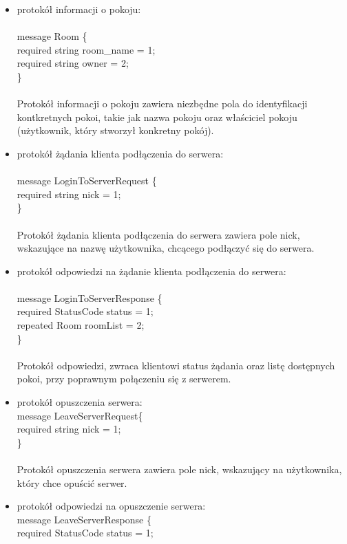 \documentclass{article}
\begin{document}
\begin{itemize}
\begin{itemize}
		
			\item protokół informacji o pokoju:\\ \\
				message Room \{\\
				required string room\_name = 1;\\
				required string owner = 2;\\
				\}\\
				\\
				Protokół informacji o pokoju zawiera niezbędne pola do identyfikacji kontkretnych pokoi, takie jak nazwa pokoju oraz właściciel pokoju (użytkownik, który stworzył konkretny pokój).
			\item protokół żądania klienta podłączenia do serwera: \\ \\
				message LoginToServerRequest \{\\
				required string nick = 1;\\
				\}\\
				\\	
				Protokół żądania klienta podłączenia do serwera zawiera pole nick, wskazujące na nazwę użytkownika, chcącego podłączyć się do serwera.
			\item protokół odpowiedzi na żądanie klienta podłączenia do serwera: \\ \\
				message LoginToServerResponse \{\\
				required StatusCode status = 1;\\
				repeated Room roomList = 2;\\
				\}\\
				\\
				Protokół odpowiedzi, zwraca klientowi status żądania oraz listę dostępnych pokoi, przy poprawnym połączeniu się z serwerem.
			\item protokół opuszczenia serwera: \\
				message LeaveServerRequest\{\\
				required string nick = 1;\\
				\}\\
				\\
				Protokół opuszczenia serwera zawiera pole nick, wskazujący na użytkownika, który chce opuścić serwer.
			\item protokół odpowiedzi na opuszczenie serwera:\\
				message LeaveServerResponse \{\\
				required StatusCode status = 1;\\

\end{itemize}
\end{itemize}
\end{document}
